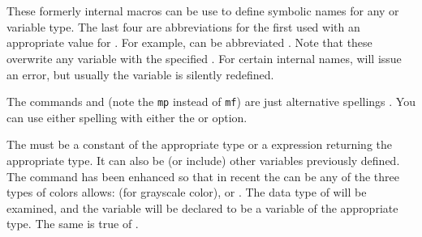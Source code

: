 \documentclass[letterpaper]{article}
\begin{document}
\begin{cd}
\\
\\
\\
\\
\\
   \\
\\
%
%
%
%
%
%
%
%
\end{cd}

These formerly internal \mfp{} macros can be use to define symbolic
names for any \MF{} or \MP{} variable type. The last four are
abbreviations for the first used with an appropriate value for
. For example,
 can be abbreviated
. Note that these overwrite any
variable with the specified . For certain internal names,
\MF{} will issue an error, but usually the variable is silently
redefined.

The commands  and  (note the
\texttt{mp} instead of \texttt{mf}) are just alternative spellings . You
can use either spelling with either the  or 
option.

The  must be a constant of the appropriate type or a \MF{}
expression returning the appropriate type. It can also be (or include)
other variables previously defined. The  command has been
enhanced so that in recent \MP{} the  can be any of the
three types of colors \MP{} allows:  (for grayscale color),
 or . The data type of  will be
examined, and the variable  will be declared to be a variable
of the appropriate type. The same is true of
.
\end{document}
